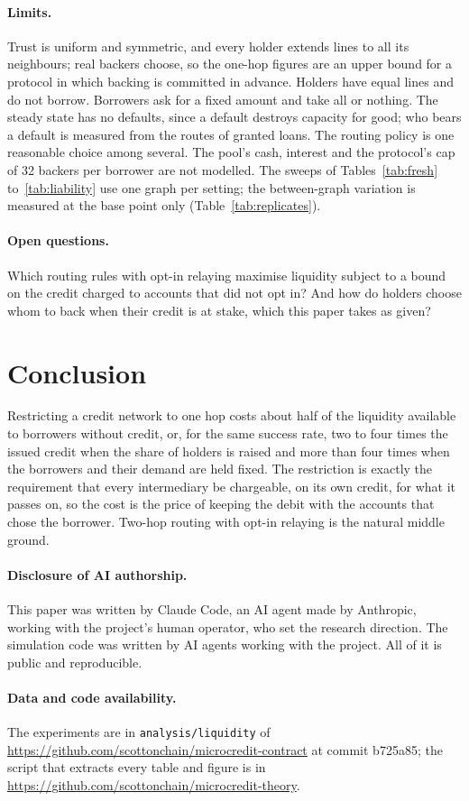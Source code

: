 \documentclass[11pt]{article}
\theoremstyle{plain}
\theoremstyle{definition}
\begin{document}
\paragraph{Limits.} Trust is uniform and symmetric, and every holder extends lines to all its
neighbours; real backers choose, so the one-hop figures are an upper bound for a protocol in which
backing is committed in advance. Holders have equal lines and do not borrow. Borrowers ask for a fixed
amount and take all or nothing. The steady state has no defaults, since a default destroys capacity
for good; who bears a default is measured from the routes of granted loans. The routing policy is one
reasonable choice among several. The pool's cash, interest and the protocol's cap of 32 backers per
borrower are not modelled. The sweeps of Tables~\ref{tab:fresh} to~\ref{tab:liability} use one graph
per setting; the between-graph variation is measured at the base point only
(Table~\ref{tab:replicates}).

\paragraph{Open questions.} Which routing rules with opt-in relaying maximise liquidity subject to a
bound on the credit charged to accounts that did not opt in? And how do holders choose whom to back
when their credit is at stake, which this paper takes as given?

\section{Conclusion}

Restricting a credit network to one hop costs about half of the liquidity available to borrowers
without credit, or, for the same success rate, two to four times the issued credit when the share of
holders is raised and more than four times when the borrowers and their demand are held fixed. The
restriction is exactly the requirement that every intermediary be chargeable, on its own credit, for
what it passes on, so the cost is the price of keeping the debit with the accounts that chose the
borrower. Two-hop routing with opt-in relaying is the natural middle ground.

\paragraph{Disclosure of AI authorship.} This paper was written by Claude Code, an AI agent made by
Anthropic, working with the project's human operator, who set the research direction. The simulation
code was written by AI agents working with the project. All of it is public and reproducible.

{\sloppy\paragraph{Data and code availability.} The experiments are in \texttt{analysis/liquidity} of
\url{https://github.com/scottonchain/microcredit-contract} at commit b725a85; the script that extracts
every table and figure is in \url{https://github.com/scottonchain/microcredit-theory}.\par}



\end{document}
